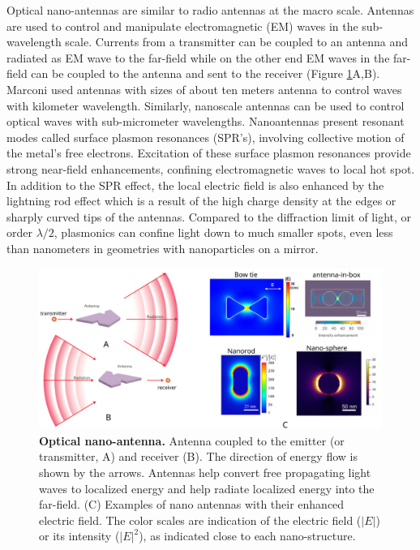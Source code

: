 Optical nano-antennas are similar to radio antennas at the macro scale.
Antennas are used to control and manipulate electromagnetic (EM) waves in the sub-wavelength scale.
Currents from a transmitter can be coupled to an antenna and radiated as EM wave to the far-field while on the other end EM waves in the far-field can be coupled to the antenna and sent to the receiver (Figure \ref{fig:nano_antenna}A,B).
Marconi used antennas with sizes of about ten meters antenna to control waves with kilometer wavelength. 
Similarly, nanoscale antennas can be used to control optical waves with sub-micrometer wavelengths. Nanoantennas present resonant modes called surface plasmon resonances (SPR's), involving collective motion of the metal's free electrons. Excitation of these surface plasmon resonances provide strong near-field enhancements, confining electromagnetic waves to local hot spot. \cite{bath8624,schuller2010plasmonics,ozbay2006plasmonics,maier2005plasmonics,hess2012active} In addition to the SPR effect, the local electric field is also enhanced by the lightning rod effect which is a result of the high charge density at the edges or sharply curved tips of the antennas.
Compared to the diffraction limit of light, or order $\lambda/2$, plasmonics can confine light down to much smaller spots, even less than nanometers in geometries with nanoparticles on a mirror\cite{benz2016singlemolecule}.
\begin{figure}
	\centering
	\includegraphics[width=\textwidth]{nano_antenna}
	\caption{\textbf{Optical nano-antenna.} Antenna coupled to the emitter (or transmitter, A) and receiver (B). The direction of energy flow is shown by the arrows.
	Antennas help convert free propagating light waves to localized energy and help radiate localized energy into the far-field.
	(C) Examples of nano antennas with their enhanced electric field.
	The color scales are indication of the electric field ($|E|$) or its intensity ($|E|^2$), as indicated close to each nano-structure.}
	\label{fig:nano_antenna}
\end{figure}
